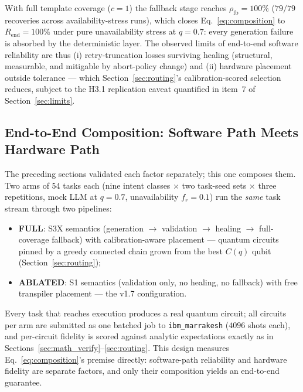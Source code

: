 ﻿\documentclass[12pt,a4paper]{article}
\begin{document}
With full template coverage ($c{=}1$) the fallback stage reaches $\rho_{\mathrm{fb}} = 100\%$ ($79/79$ recoveries across availability-stress runs), which closes Eq.~\eqref{eq:composition} to $R_{\mathrm{end}} = 100\%$ under pure unavailability stress at $q = 0.7$: every generation failure is absorbed by the deterministic layer. The observed limits of end-to-end software reliability are thus (i) retry-truncation losses surviving healing (structural, measurable, and mitigable by abort-policy change) and (ii) hardware placement outside tolerance --- which Section~\ref{sec:routing}'s calibration-scored selection reduces, subject to the H3.1 replication caveat quantified in item~7 of Section~\ref{sec:limits}.

\subsection{End-to-End Composition: Software Path Meets Hardware Path}\label{sec:e2e}

The preceding sections validated each factor separately; this one composes them. Two arms of 54 tasks each (nine intent classes $\times$ two task-seed sets $\times$ three repetitions, mock LLM at $q = 0.7$, unavailability $f_r = 0.1$) run the \emph{same} task stream through two pipelines:
\begin{itemize}
    \item \textbf{FULL}: S3X semantics (generation $\rightarrow$ validation $\rightarrow$ healing $\rightarrow$ full-coverage fallback) with calibration-aware placement --- quantum circuits pinned by a greedy connected chain grown from the best $C(q)$ qubit (Section~\ref{sec:routing});
    \item \textbf{ABLATED}: S1 semantics (validation only, no healing, no fallback) with free transpiler placement --- the v1.7 configuration.
\end{itemize}
Every task that reaches execution produces a real quantum circuit; all circuits per arm are submitted as one batched job to \texttt{ibm\_marrakesh} ($4096$ shots each), and per-circuit fidelity is scored against analytic expectations exactly as in Sections~\ref{sec:math_verify}--\ref{sec:routing}. This design measures Eq.~\eqref{eq:composition}'s premise directly: software-path reliability and hardware fidelity are separate factors, and only their composition yields an end-to-end guarantee.
\end{document}
